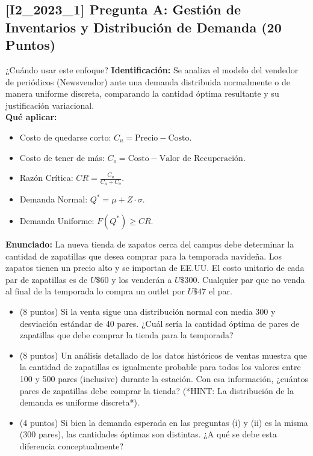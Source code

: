 \documentclass[11pt, a4paper]{article}
\begin{document}
\subsection*{[I2_2023_1] Pregunta A: Gestión de Inventarios y Distribución de Demanda (20 Puntos)}
\begin{tipprueba}{¿Cuándo usar este enfoque?}
    \textbf{Identificación:} Se analiza el modelo del vendedor de periódicos (Newsvendor) ante una demanda distribuida normalmente o de manera uniforme discreta, comparando la cantidad óptima resultante y su justificación variacional.\\
    \textbf{Qué aplicar:}
    \begin{itemize}
      \item Costo de quedarse corto: $C_u = \text{Precio} - \text{Costo}$.
      \item Costo de tener de más: $C_o = \text{Costo} - \text{Valor de Recuperación}$.
      \item Razón Crítica: $CR = \frac{C_u}{C_u + C_o}$.
      \item Demanda Normal: $Q^* = \mu + Z \cdot \sigma$.
      \item Demanda Uniforme: $F(Q^*) \ge CR$.
    \end{itemize}
  \end{tipprueba}

  \textbf{Enunciado:}
  La nueva tienda de zapatos cerca del campus debe determinar la cantidad de zapatillas que desea comprar para la temporada navideña. Los zapatos tienen un precio alto y se importan de EE.UU. El costo unitario de cada par de zapatillas es de $U\$60$ y los venderán a $U\$300$. Cualquier par que no venda al final de la temporada lo compra un outlet por $U\$47$ el par.

  \begin{itemize}
    \item[\textbf{i.}] (8 puntos) Si la venta sigue una distribución normal con media 300 y desviación estándar de 40 pares. ¿Cuál sería la cantidad óptima de pares de zapatillas que debe comprar la tienda para la temporada?
    \item[\textbf{ii.}] (8 puntos) Un análisis detallado de los datos históricos de ventas muestra que la cantidad de zapatillas es igualmente probable para todos los valores entre 100 y 500 pares (inclusive) durante la estación. Con esa información, ¿cuántos pares de zapatillas debe comprar la tienda? (*HINT: La distribución de la demanda es uniforme discreta*).
    \item[\textbf{iii.}] (4 puntos) Si bien la demanda esperada en las preguntas (i) y (ii) es la misma ($300$ pares), las cantidades óptimas son distintas. ¿A qué se debe esta diferencia conceptualmente?
  \end{itemize}
\end{document}
